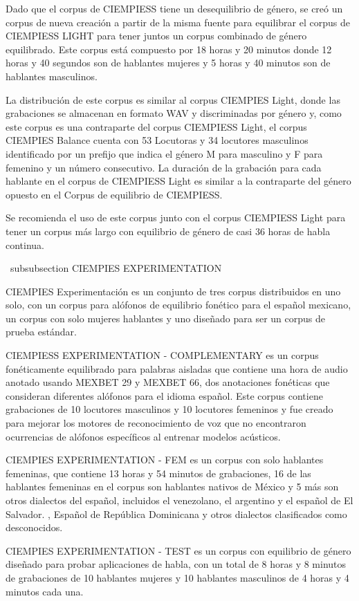 \documentclass[a4paper,12pt,twoside]{report}
\begin{document}
Dado que el corpus de CIEMPIESS tiene un desequilibrio de género, se creó un corpus de nueva creación a partir de la misma fuente para equilibrar el corpus de CIEMPIESS LIGHT para tener juntos un corpus combinado de género equilibrado. Este corpus está compuesto por 18 horas y 20 minutos donde 12 horas y 40 segundos son de hablantes mujeres y 5 horas y 40 minutos son de hablantes masculinos.

La distribución de este corpus es similar al corpus CIEMPIES Light, donde las grabaciones se almacenan en formato WAV y discriminadas por género y, como este corpus es una contraparte del corpus CIEMPIESS Light, el corpus CIEMPIES Balance cuenta con 53 Locutoras y 34 locutores masculinos identificado por un prefijo que indica el género M para masculino y F para femenino y un número consecutivo. La duración de la grabación para cada hablante en el corpus de CIEMPIESS Light es similar a la contraparte del género opuesto en el Corpus de equilibrio de CIEMPIESS.

Se recomienda el uso de este corpus junto con el corpus CIEMPIESS Light para tener un corpus más largo con equilibrio de género de casi 36 horas de habla continua.

\ subsubsection {CIEMPIES EXPERIMENTATION }

CIEMPIES Experimentación es un conjunto de tres corpus distribuidos en uno solo, con un corpus para alófonos de equilibrio fonético para el español mexicano, un corpus con solo mujeres hablantes y uno diseñado para ser un corpus de prueba estándar.

CIEMPIESS EXPERIMENTATION - COMPLEMENTARY es un corpus fonéticamente equilibrado para palabras aisladas que contiene una hora de audio anotado usando MEXBET 29 y MEXBET 66, dos anotaciones fonéticas que consideran diferentes alófonos para el idioma español. Este corpus contiene grabaciones de 10 locutores masculinos y 10 locutores femeninos y fue creado para mejorar los motores de reconocimiento de voz que no encontraron ocurrencias de alófonos específicos al entrenar modelos acústicos.

CIEMPIES EXPERIMENTATION  - FEM es un corpus con solo hablantes femeninas, que contiene 13 horas y 54 minutos de grabaciones, 16 de las hablantes femeninas en el corpus son hablantes nativos de México y 5 más son otros dialectos del español, incluidos el venezolano, el argentino y el español de El Salvador. , Español de República Dominicana y otros dialectos clasificados como desconocidos.

CIEMPIES EXPERIMENTATION  - TEST es un corpus con equilibrio de género diseñado para probar aplicaciones de habla, con un total de 8 horas y 8 minutos de grabaciones de 10 hablantes mujeres y 10 hablantes masculinos de 4 horas y 4 minutos cada una.
\end{document}

